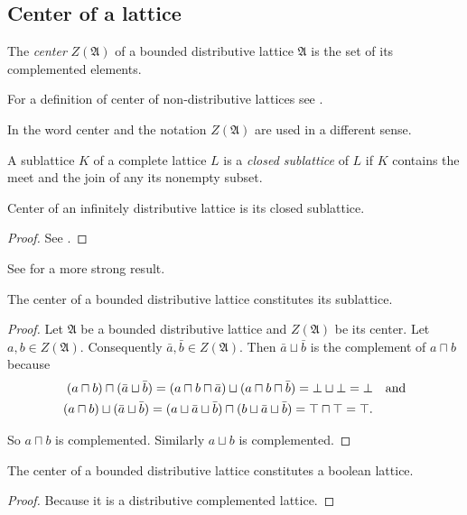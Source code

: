 \subsection{Center of a lattice}
\begin{defn}
The \emph{center} $Z(\mathfrak{A})$ of a bounded
distributive lattice $\mathfrak{A}$ is the set of its complemented
elements.\end{defn}
\begin{rem}
For a definition of center of non-distributive lattices see \cite{neutralelements}.
\end{rem}

\begin{rem}
In \cite{ADTCGSBVA} the word center and the notation $Z(\mathfrak{A})$
are used in a different sense.\end{rem}
\begin{defn}
A sublattice $K$ of a complete lattice
$L$ is a \emph{closed sublattice} of $L$ if $K$ contains the meet
and the join of any its nonempty subset.\end{defn}
\begin{thm}
Center of an infinitely distributive lattice is its closed sublattice.\end{thm}
\begin{proof}
See \cite{center-inf-distr}.\end{proof}
\begin{rem}
See \cite{center-complete} for a more strong result.\end{rem}
\begin{thm}
The center of a bounded distributive lattice constitutes its sublattice.\end{thm}
\begin{proof}
Let $\mathfrak{A}$ be a bounded distributive lattice and $Z(\mathfrak{A})$
be its center. Let $a,b\in Z(\mathfrak{A})$. Consequently $\bar{a},\bar{b}\in Z(\mathfrak{A})$.
Then $\bar{a}\sqcup\bar{b}$ is the complement of $a\sqcap b$ because
\begin{align*}
(a\sqcap b)\sqcap(\bar{a}\sqcup\bar{b})=(a\sqcap b\sqcap\bar{a})\sqcup(a\sqcap b\sqcap\bar{b})=\bot\sqcup\bot=\bot & \text{\quad and}\\
(a\sqcap b)\sqcup(\bar{a}\sqcup\bar{b})=(a\sqcup\bar{a}\sqcup\bar{b})\sqcap(b\sqcup{\bar{a}\sqcup\bar{b}})=\top\sqcap\top=\top.
\end{align*}


So $a\sqcap b$ is complemented. Similarly $a\sqcup b$ is complemented.\end{proof}
\begin{thm}
\label{centr-bool}The center of a bounded distributive lattice constitutes
a boolean lattice.\end{thm}
\begin{proof}
Because it is a distributive complemented lattice.
\end{proof}

